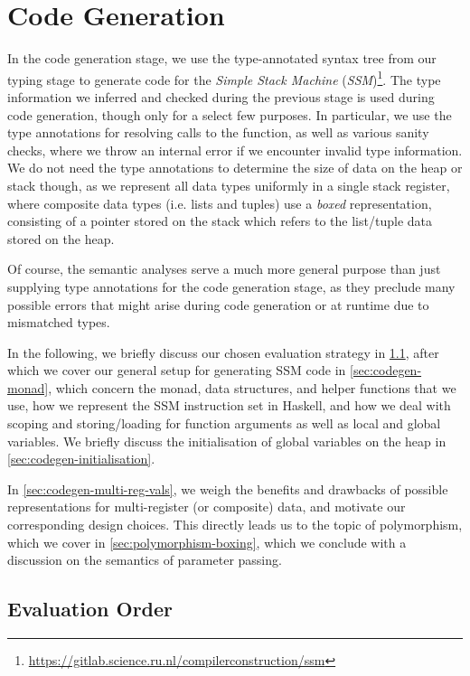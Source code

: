 \chapter{Code Generation} \label{chp:codegen}

In the code generation stage, we use the type-annotated syntax tree from our
typing stage to generate code for the \emph{Simple Stack Machine}
(\emph{SSM})\footnote{\url{https://gitlab.science.ru.nl/compilerconstruction/ssm}}.
The type information we inferred and checked during the previous stage is used
during code generation, though only for a select few purposes.
In particular, we use the type annotations for resolving calls to the
 function, as well as various sanity checks, where we throw an
internal error if we encounter invalid type information.
We do not need the type annotations to determine the size of data on the heap or
stack though, as we represent all data types uniformly in a single stack
register, where composite data types (i.e. lists and tuples) use a \emph{boxed}
representation, consisting of a pointer stored on the stack which refers to
the list/tuple data stored on the heap.

Of course, the semantic analyses serve a much more general purpose than just
supplying type annotations for the code generation stage, as they preclude many
possible errors that might arise during code generation or at runtime due to
mismatched types.

In the following, we briefly discuss our chosen evaluation strategy in
\cref{sec:codegen-eval-order}, after which we cover our general setup for
generating SSM code in \cref{sec:codegen-monad},
which concern the monad, data structures, and helper functions that we use, how
we represent the SSM instruction set in Haskell, and how we deal with scoping
and storing/loading for function arguments as well as local and global variables.
We briefly discuss the initialisation of global variables on the heap in
\cref{sec:codegen-initialisation}.

In \cref{sec:codegen-multi-reg-vals}, we weigh the benefits and drawbacks of possible
representations for multi-register (or composite) data, and motivate our corresponding
design choices. This directly leads us to the topic of polymorphism, which we
cover in \cref{sec:polymorphism-boxing}, which we conclude with a discussion on
the semantics of parameter passing.



\section{Evaluation Order} \label{sec:codegen-eval-order}


